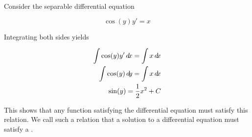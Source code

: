 \documentclass{ximera}
\begin{document}
\begin{example}
	Consider the separable differential equation
	
	\[
	\cos(y) y' = x
	\]
	
	Integrating both sides yields
	
	\begin{align*}
		\int \cos(y) y' \d x = \int x \d x\\
		\int \cos(y) \d y = \int x \d x\\
		\sin(y) = \frac{1}{2}x^2+C
	\end{align*}
	
	This shows that any function satisfying the differential equation must satisfy this relation.  We call such a relation that a solution to a differential equation must satisfy a .
	
\end{example}
\end{document}
